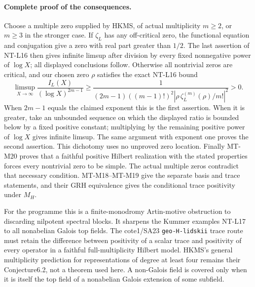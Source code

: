 \paragraph{Complete proof of the consequences.}
Choose a multiple zero supplied by HKMS, of actual multiplicity
$m\ge2$, or $m\ge3$ in the stronger case. If $\zeta_L$ has any
off-critical zero, the functional equation and conjugation give
a zero with real part greater than $1/2$. The last assertion of
NT-L16 then gives infinite limsup after division by every fixed
nonnegative power of $\log X$; all displayed conclusions follow.
Otherwise all nontrivial zeros are critical, and our chosen zero
$\rho$ satisfies the exact NT-L16 bound
\[
 \limsup_{X\to\infty}\frac{I_L(X)}{(\log X)^{2m-1}}
 \ge
 \frac{1}{(2m-1)((m-1)!)^2
       |\rho\,\zeta_L^{(m)}(\rho)/m!|^2}>0.
\]
When $2m-1$ equals the claimed exponent this is the first assertion.
When it is greater, take an unbounded sequence on which the
displayed ratio is bounded below by a fixed positive constant;
multiplying by the remaining positive power of $\log X$ gives
infinite limsup. The same argument with exponent one proves
the second assertion. This dichotomy uses no unproved zero
location. Finally MT-M20 proves that a faithful positive Hilbert
realization with the stated properties forces every nontrivial
zero to be simple. The actual multiple zeros contradict that
necessary condition. MT-M18--MT-M19 give the separate basis and
trace statements, and their GRH equivalence gives the conditional
trace positivity under $M_H$.

For the programme this is a finite-monodromy Artin-motive
obstruction to discarding nilpotent spectral blocks. It sharpens
the Kummer examples NT-L17 to all nonabelian Galois top fields.
The cote1/SA23 \texttt{geo-H-lidskii} trace route must retain the
difference between positivity of a scalar trace and positivity
of every operator in a faithful full-multiplicity Hilbert model.
HKMS's general multiplicity prediction for representations of
degree at least four remains their Conjecture6.2, not a theorem
used here. A non-Galois field is covered only when it is itself
the top field of a nonabelian Galois extension of some subfield.

